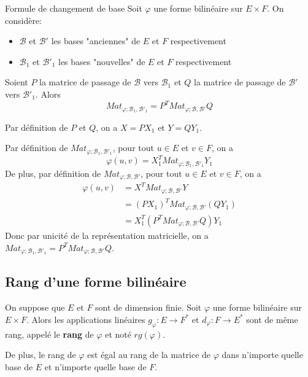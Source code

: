 \documentclass[a4paper, 12pt]{article}
\begin{document}
\begin{theoreme}{Formule de changement de base}{}
    Soit $\varphi$ une forme bilinéaire sur $E \times F$.
    On considère:
    \begin{itemize}
        \item $\mathscr{B}$ et $\mathscr{B'}$ les bases "anciennes" de $E$ et $F$ respectivement
        \item $\mathscr{B}_1$ et $\mathscr{B'}_1$ les bases "nouvelles" de $E$ et $F$ respectivement
    \end{itemize}
    Soient $P$ la matrice de passage de $\mathscr{B}$ vers $\mathscr{B}_1$ et $Q$ la matrice de passage de $\mathscr{B'}$ vers $\mathscr{B'}_1$. Alors
    $$
    Mat_{\varphi; \mathscr{B}_1, \mathscr{B'}_1} = P^T Mat_{\varphi; \mathscr{B}, \mathscr{B'}} Q
    $$
\end{theoreme}

\begin{demonstration}
    Par définition de $P$ et $Q$, on a $X = P X_1$ et $Y = Q Y_1$.

    Par définition de $Mat_{\varphi; \mathscr{B}_1, \mathscr{B'}_1}$, pour tout $u \in E$ et $v \in F$, on a
    $$
    \varphi(u, v) = X_1^T Mat_{\varphi; \mathscr{B}_1, \mathscr{B'}_1} Y_1
    $$
    De plus, par définition de $Mat_{\varphi; \mathscr{B}, \mathscr{B'}}$, pour tout $u \in E$ et $v \in F$, on a
    \begin{align*}
    \varphi(u, v) &= X^T Mat_{\varphi; \mathscr{B}, \mathscr{B'}} Y \\
    &= (P X_1)^T Mat_{\varphi; \mathscr{B}, \mathscr{B'}} (Q Y_1) \\
    &= X_1^T \left( P^T Mat_{\varphi; \mathscr{B}, \mathscr{B'}} Q \right) Y_1
    \end{align*}
    Donc par unicité de la représentation matricielle, on a $Mat_{\varphi; \mathscr{B}_1, \mathscr{B'}_1} = P^T Mat_{\varphi; \mathscr{B}, \mathscr{B'}} Q$.
\end{demonstration}

\subsection{Rang d'une forme bilinéaire}

\begin{definition}
    On suppose que $E$ et $F$ sont de dimension finie. Soit $\varphi$ une forme bilinéaire sur $E \times F$. 
    Alors les applications linéaires $g_\varphi: E \to F^*$ et $d_\varphi: F \to E^*$ sont de même rang, appelé le \textbf{rang} de $\varphi$ et noté $rg(\varphi)$.

    De plus, le rang de $\varphi$ est égal au rang de la matrice de $\varphi$ dans n'importe quelle base de $E$ et n'importe quelle base de $F$.
\end{definition}
\end{document}
